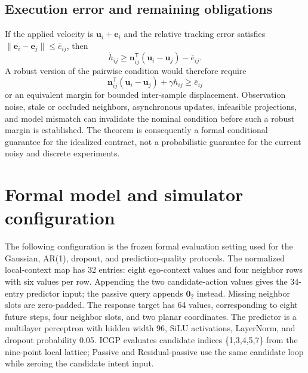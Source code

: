 \documentclass[pdflatex,sn-mathphys-num]{sn-jnl}
\begin{document}
\subsection{Execution error and remaining obligations}

If the applied velocity is $\mathbf{u}_i+\mathbf{e}_i$ and the relative tracking error satisfies $\lVert\mathbf{e}_i-\mathbf{e}_j\rVert\leq\bar e_{ij}$, then
\begin{equation}
\dot h_{ij}\geq\mathbf{n}_{ij}^{\mathsf T}(\mathbf{u}_i-\mathbf{u}_j)-\bar e_{ij}.
\label{eq:appendix-tracking}
\end{equation}
A robust version of the pairwise condition would therefore require
\begin{equation}
\mathbf{n}_{ij}^{\mathsf T}(\mathbf{u}_i-\mathbf{u}_j)+\gamma h_{ij}\geq\bar e_{ij}
\label{eq:appendix-robust-condition}
\end{equation}
or an equivalent margin for bounded inter-sample displacement. Observation noise, stale or occluded neighbors, asynchronous updates, infeasible projections, and model mismatch can invalidate the nominal condition before such a robust margin is established. The theorem is consequently a formal conditional guarantee for the idealized contract, not a probabilistic guarantee for the current noisy and discrete experiments.

\section{Formal model and simulator configuration}
\label{app:configuration}

The following configuration is the frozen formal evaluation setting used for
the Gaussian, AR(1), dropout, and prediction-quality protocols. The normalized
local-context map has 32 entries: eight ego-context values and four neighbor
rows with six values per row. Appending the two candidate-action values gives
the 34-entry predictor input; the passive query appends $\mathbf{0}_2$ instead.
Missing neighbor slots are zero-padded. The response target has 64 values, corresponding to
eight future steps, four neighbor slots, and two planar coordinates. The
predictor is a multilayer perceptron with hidden width 96, SiLU activations,
LayerNorm, and dropout probability 0.05. ICGP evaluates candidate indices
\{1,3,4,5,7\} from the nine-point local lattice; Passive and
Residual-passive use the same candidate loop while zeroing the candidate
intent input.
\end{document}
